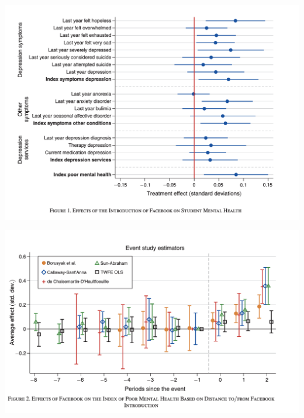 \documentclass{beamer}
\begin{document}
\begin{frame}
\begin{center}
\includegraphics[scale=0.35]{./lecture_includes/facebook_2}
\end{center}
\end{frame}

\begin{frame}
\begin{center}
\includegraphics[scale=0.35]{./lecture_includes/facebook_3}
\end{center}
\end{frame}
\end{document}
